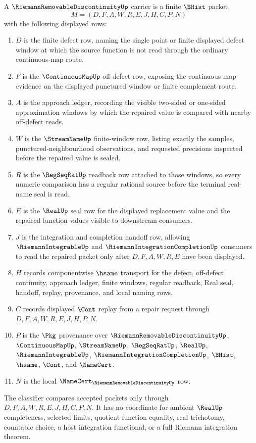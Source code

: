 \begin{definition}
\label{def:riemann-removable-discontinuity-carrier}
A $\RiemannRemovableDiscontinuityUp$ carrier is a finite $\BHist$ packet
$$
M=(D,F,A,W,R,E,J,H,C,P,N)
$$
with the following displayed rows:
\begin{enumerate}
\item $D$ is the finite defect row, naming the single point or finite displayed defect window at which the source function is not read through the ordinary continuous-map route.
\item $F$ is the $\ContinuousMapUp$ off-defect row, exposing the continuous-map evidence on the displayed punctured window or finite complement route.
\item $A$ is the approach ledger, recording the visible two-sided or one-sided approximation windows by which the repaired value is compared with nearby off-defect reads.
\item $W$ is the $\StreamNameUp$ finite-window row, listing exactly the samples, punctured-neighbourhood observations, and requested precisions inspected before the repaired value is sealed.
\item $R$ is the $\RegSeqRatUp$ readback row attached to those windows, so every numeric comparison has a regular rational source before the terminal real-name seal is read.
\item $E$ is the $\RealUp$ seal row for the displayed replacement value and the repaired function values visible to downstream consumers.
\item $J$ is the integration and completion handoff row, allowing $\RiemannIntegrableUp$ and $\RiemannIntegrationCompletionUp$ consumers to read the repaired packet only after $D,F,A,W,R,E$ have been displayed.
\item $H$ records componentwise $\hsame$ transport for the defect, off-defect continuity, approach ledger, finite windows, regular readback, Real seal, handoff, replay, provenance, and local naming rows.
\item $C$ records displayed $\Cont$ replay from a repair request through $D,F,A,W,R,E,J,H,P,N$.
\item $P$ is the $\Pkg$ provenance over $\RiemannRemovableDiscontinuityUp$, $\ContinuousMapUp$, $\StreamNameUp$, $\RegSeqRatUp$, $\RealUp$, $\RiemannIntegrableUp$, $\RiemannIntegrationCompletionUp$, $\BHist$, $\hsame$, $\Cont$, and $\NameCert$.
\item $N$ is the local $\NameCert_{\RiemannRemovableDiscontinuityUp}$ row.
\end{enumerate}
The classifier compares accepted packets only through $D,F,A,W,R,E,J,H,C,P,N$. It has no coordinate for ambient $\RealUp$ completeness, selected limits, quotient function equality, real trichotomy, countable choice, a host integration functional, or a full Riemann integration theorem.
\end{definition}

